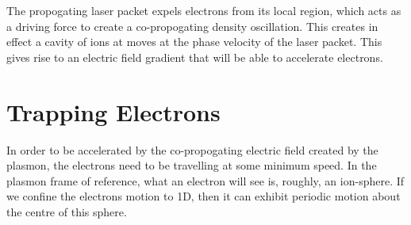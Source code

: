 \documentclass[12pt,letterpaper, titlepage]{article}
\begin{document}
The propogating laser packet expels electrons from its local region, which acts
as a driving force to create a co-propogating density oscillation. This creates 
in effect a cavity of ions at moves at the phase velocity of the laser packet.  
This gives rise to an electric field gradient that will be able to accelerate 
electrons.
\section{Trapping Electrons}
In order to be accelerated by the co-propogating electric field created by the
plasmon, the electrons need to be travelling at some minimum speed. In the
plasmon frame of reference, what an electron will see is, roughly, an
ion-sphere. If we confine the electrons motion to 1D, then it can exhibit
periodic motion about the centre of this sphere. 
\end{document}
